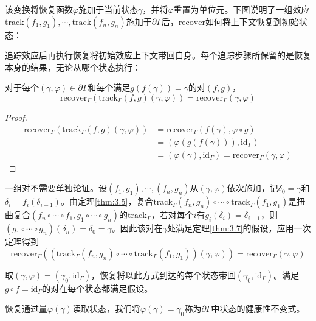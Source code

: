 该变换将恢复函数$\varphi$施加于当前状态$\gamma$，并将$\varphi$重置为单位元。下图说明了一组效应$\mathrm{track}(f_1, g_1), \cdots, \mathrm{track}(f_n, g_n)$施加于$\partial\Gamma$后，$\mathrm{recover}$如何将上下文恢复到初始状态：

追踪效应后再执行恢复将初始效应上下文带回自身。每个追踪步骤所保留的是恢复本身的结果，无论从哪个状态执行：

\begin{theorem}\label{thm:3.7}
对于每个$(\gamma, \varphi) \in \partial\Gamma$和每个满足$g(f(\gamma)) = \gamma$的对$(f, g)$，
\begin{equation}\label{eq:3.10}
\mathrm{recover}_\Gamma(\mathrm{track}_\Gamma(f, g)(\gamma, \varphi)) = \mathrm{recover}_\Gamma(\gamma, \varphi)
\end{equation}
\end{theorem}

\begin{proof}
\begin{align*}
\mathrm{recover}_\Gamma(\mathrm{track}_\Gamma(f, g)(\gamma, \varphi)) &= \mathrm{recover}_\Gamma(f(\gamma), \varphi \circ g) \\
&= (\varphi(g(f(\gamma))), \mathrm{id}_\Gamma) \\
&= (\varphi(\gamma), \mathrm{id}_\Gamma) = \mathrm{recover}_\Gamma(\gamma, \varphi)
\end{align*}
\end{proof}

一组对不需要单独论证。设$(f_1, g_1), \cdots, (f_n, g_n)$从$(\gamma, \varphi)$依次施加，记$\delta_0 = \gamma$和$\delta_i = f_i(\delta_{i-1})$。由定理\ref{thm:3.5}，复合$\mathrm{track}_\Gamma(f_n, g_n) \circ \cdots \circ \mathrm{track}_\Gamma(f_1, g_1)$是扭曲复合$(f_n \circ \cdots \circ f_1, g_1 \circ \cdots \circ g_n)$的$\mathrm{track}_\Gamma$，若对每个$i$有$g_i(\delta_i) = \delta_{i-1}$，则$(g_1 \circ \cdots \circ g_n)(\delta_n) = \delta_0 = \gamma$。因此该对在$\gamma$处满足定理\ref{thm:3.7}的假设，应用一次定理得到
\begin{equation}\label{eq:3.11}
\mathrm{recover}_\Gamma((\mathrm{track}_\Gamma(f_n, g_n) \circ \cdots \circ \mathrm{track}_\Gamma(f_1, g_1))(\gamma, \varphi)) = \mathrm{recover}_\Gamma(\gamma, \varphi)
\end{equation}

取$(\gamma, \varphi) = (\gamma_0, \mathrm{id}_\Gamma)$，恢复将以此方式到达的每个状态带回$(\gamma_0, \mathrm{id}_\Gamma)$。满足$g \circ f = \mathrm{id}_\Gamma$的对在每个状态都满足假设。

恢复通过量$\varphi(\gamma)$读取状态，我们将$\varphi(\gamma) = \gamma_0$称为$\partial\Gamma$中状态的健康性不变式。

